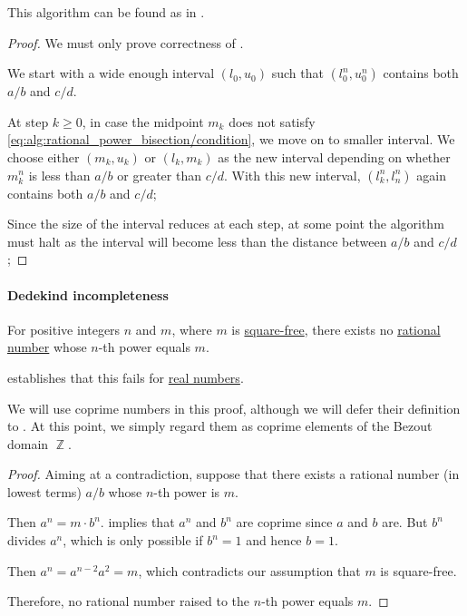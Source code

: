 \begin{comments}
  \item This algorithm can be found as  in \cite{notebook:code}.
\end{comments}
\begin{proof}
  We must only prove correctness of .

  We start with a wide enough interval \( (l_0, u_0) \) such that \( (l_0^n, u_0^n) \) contains both \( a / b \) and \( c / d \).

  At step \( k \geq 0 \), in case the midpoint \( m_k \) does not satisfy \eqref{eq:alg:rational_power_bisection/condition}, we move on to smaller interval. We choose either \( (m_k, u_k) \) or \( (l_k, m_k) \) as the new interval depending on whether \( m_k^n \) is less than \( a / b \) or greater than \( c / d \). With this new interval, \( (l_k^n, l_n^n) \) again contains both \( a / b \) and \( c / d \);

  Since the size of the interval reduces at each step, at some point the algorithm must halt as the interval will become less than the distance between \( a / b \) and \( c / d \);
\end{proof}

\paragraph{Dedekind incompleteness}

\begin{proposition}\label{thm:nth_root_is_not_rational}
  For positive integers \( n \) and \( m \), where \( m \) is \hyperref[def:square_free_element]{square-free}, there exists no \hyperref[def:rational_numbers]{rational number} whose \( n \)-th power equals \( m \).
\end{proposition}
\begin{comments}
  \item {} establishes that this fails for \hyperref[def:real_numbers]{real numbers}.
  \item We will use coprime numbers in this proof, although we will defer their definition to . At this point, we simply regard them as coprime elements of the Bezout domain \( \BbbZ \).
\end{comments}
\begin{proof}
  Aiming at a contradiction, suppose that there exists a rational number (in lowest terms) \( a / b \) whose \( n \)-th power is \( m \).

  Then \( a^n = m \cdot b^n \).  implies that \( a^n \) and \( b^n \) are coprime since \( a \) and \( b \) are. But \( b^n \) divides \( a^n \), which is only possible if \( b^n = 1 \) and hence \( b = 1 \).

  Then \( a^n = a^{n - 2} a^2 = m \), which contradicts our assumption that \( m \) is square-free.

  Therefore, no rational number raised to the \( n \)-th power equals \( m \).
\end{proof}

